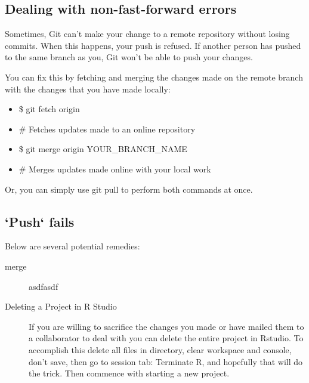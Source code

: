 \documentclass[12pt]{../SOP4_alpha}\usepackage[]{graphicx}\usepackage[]{color}
\begin{document}
\subsection{Dealing with non-fast-forward errors}

\NP Sometimes, Git can't make your change to a remote repository without losing commits. When this happens, your push is refused. If another person has pushed to the same branch as you, Git won't be able to push your changes.

\NP You can fix this by fetching and merging the changes made on the remote branch with the changes that you have made locally:
\begin{itemize}
  \item \$ git fetch origin
  \item \# Fetches updates made to an online repository
  \item \$ git merge origin YOUR\_BRANCH\_NAME
  \item \# Merges updates made online with your local work
\end{itemize}

\NP Or, you can simply use git pull to perform both commands at once.



\subsection{`Push` fails}

\NP Below are several potential remedies:

\begin{description}
  \item[merge] asdfasdf
  
  \item[Deleting a Project in R Studio]If you are willing to sacrifice the changes you made or have mailed them to a collaborator to deal with you can delete the entire project in Rstudio. To accomplish this delete all files in directory, clear workspace and console, don't save, then go to session tab: Terminate R, and hopefully that will do the trick. Then commence with starting a new project. 

\end{description}


\end{document}
